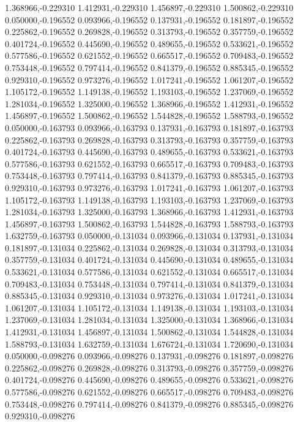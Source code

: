 1.368966,-0.229310
1.412931,-0.229310
1.456897,-0.229310
1.500862,-0.229310
0.050000,-0.196552
0.093966,-0.196552
0.137931,-0.196552
0.181897,-0.196552
0.225862,-0.196552
0.269828,-0.196552
0.313793,-0.196552
0.357759,-0.196552
0.401724,-0.196552
0.445690,-0.196552
0.489655,-0.196552
0.533621,-0.196552
0.577586,-0.196552
0.621552,-0.196552
0.665517,-0.196552
0.709483,-0.196552
0.753448,-0.196552
0.797414,-0.196552
0.841379,-0.196552
0.885345,-0.196552
0.929310,-0.196552
0.973276,-0.196552
1.017241,-0.196552
1.061207,-0.196552
1.105172,-0.196552
1.149138,-0.196552
1.193103,-0.196552
1.237069,-0.196552
1.281034,-0.196552
1.325000,-0.196552
1.368966,-0.196552
1.412931,-0.196552
1.456897,-0.196552
1.500862,-0.196552
1.544828,-0.196552
1.588793,-0.196552
0.050000,-0.163793
0.093966,-0.163793
0.137931,-0.163793
0.181897,-0.163793
0.225862,-0.163793
0.269828,-0.163793
0.313793,-0.163793
0.357759,-0.163793
0.401724,-0.163793
0.445690,-0.163793
0.489655,-0.163793
0.533621,-0.163793
0.577586,-0.163793
0.621552,-0.163793
0.665517,-0.163793
0.709483,-0.163793
0.753448,-0.163793
0.797414,-0.163793
0.841379,-0.163793
0.885345,-0.163793
0.929310,-0.163793
0.973276,-0.163793
1.017241,-0.163793
1.061207,-0.163793
1.105172,-0.163793
1.149138,-0.163793
1.193103,-0.163793
1.237069,-0.163793
1.281034,-0.163793
1.325000,-0.163793
1.368966,-0.163793
1.412931,-0.163793
1.456897,-0.163793
1.500862,-0.163793
1.544828,-0.163793
1.588793,-0.163793
1.632759,-0.163793
0.050000,-0.131034
0.093966,-0.131034
0.137931,-0.131034
0.181897,-0.131034
0.225862,-0.131034
0.269828,-0.131034
0.313793,-0.131034
0.357759,-0.131034
0.401724,-0.131034
0.445690,-0.131034
0.489655,-0.131034
0.533621,-0.131034
0.577586,-0.131034
0.621552,-0.131034
0.665517,-0.131034
0.709483,-0.131034
0.753448,-0.131034
0.797414,-0.131034
0.841379,-0.131034
0.885345,-0.131034
0.929310,-0.131034
0.973276,-0.131034
1.017241,-0.131034
1.061207,-0.131034
1.105172,-0.131034
1.149138,-0.131034
1.193103,-0.131034
1.237069,-0.131034
1.281034,-0.131034
1.325000,-0.131034
1.368966,-0.131034
1.412931,-0.131034
1.456897,-0.131034
1.500862,-0.131034
1.544828,-0.131034
1.588793,-0.131034
1.632759,-0.131034
1.676724,-0.131034
1.720690,-0.131034
0.050000,-0.098276
0.093966,-0.098276
0.137931,-0.098276
0.181897,-0.098276
0.225862,-0.098276
0.269828,-0.098276
0.313793,-0.098276
0.357759,-0.098276
0.401724,-0.098276
0.445690,-0.098276
0.489655,-0.098276
0.533621,-0.098276
0.577586,-0.098276
0.621552,-0.098276
0.665517,-0.098276
0.709483,-0.098276
0.753448,-0.098276
0.797414,-0.098276
0.841379,-0.098276
0.885345,-0.098276
0.929310,-0.098276
